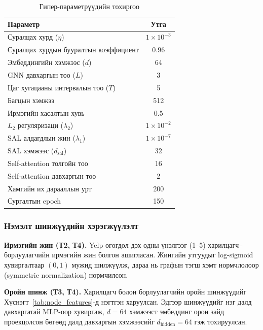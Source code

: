\documentclass[conference]{IEEEtran}
\begin{document}
\begin{table}[h]
\centering
\renewcommand{\arraystretch}{1.3}
\setlength{\tabcolsep}{10pt}
\caption{Гипер-параметрүүдийн тохиргоо}
\label{tab:hyperparams}
\begin{tabular}{|l|c|}
\hline
\textbf{Параметр} & \textbf{Утга} \\
\hline
Суралцах хурд ($\eta$) & $1 \times 10^{-3}$ \\
\hline
Суралцах хурдын бууралтын коэффициент & 0.96 \\
\hline
Эмбеддингийн хэмжээс ($d$) & 64 \\
\hline
GNN давхаргын тоо ($L$) & 3 \\
\hline
Цаг хугацааны интервалын тоо ($T$) & 5 \\
\hline
Багцын хэмжээ & 512 \\
\hline
Ирмэгийн хасалтын хувь & 0.5 \\
\hline
$L_2$ регуляризаци ($\lambda_2$) & $1 \times 10^{-2}$ \\
\hline
SAL алдагдлын жин ($\lambda_1$) & $1 \times 10^{-7}$ \\
\hline
SAL хэмжээс ($d_{\text{sal}}$) & 32 \\
\hline
Self-attention толгойн тоо & 16 \\
\hline
Self-attention давхаргын тоо & 2 \\
\hline
Хамгийн их дарааллын урт & 200 \\
\hline
Сургалтын epoch & 150 \\
\hline
\end{tabular}
\end{table}
\subsubsection{Нэмэлт шинжүүдийн хэрэгжүүлэлт}

\textbf{Ирмэгийн жин (Т2, Т4).}
Yelp өгөгдөл дэх одны үнэлгээг (1–5) харилцагч–борлуулагчийн ирмэгийн жин болгон ашигласан. Жингийн утгуудыг log-sigmoid хувиргалтаар $(0,1)$ мужид шилжүүлж, дараа нь графын тэгш хэмт нормчлолоор (symmetric normalization) нормчилсон.

\textbf{Оройн шинж (Т3, Т4).}
Харилцагч болон борлуулагчийн оройн шинжүүдийг Хүснэгт~\ref{tab:node_features}-д нэгтгэн харуулсан. Эдгээр шинжүүдийг нэг далд давхаргатай MLP-оор хувиргаж, $d = 64$ хэмжээст эмбеддинг орон зайд проекцолсон бөгөөд далд давхаргын хэмжээсийг $d_{\text{hidden}} = 64$ гэж тохируулсан.
\end{document}
